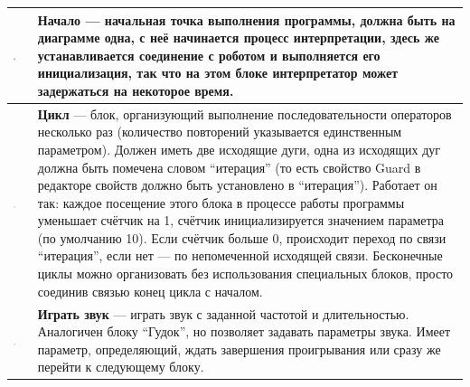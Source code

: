 \documentclass[a4paper,12pt,twoside]{article}
\begin{document}
\begin{center}
	\begin{tabular}{m{} | m{}}
    {\vspace{10pt}\includegraphics[width=0.15\textwidth]{Begin.png}}         & \textbf{Начало} --- начальная точка выполнения программы, должна быть на диаграмме одна, с неё начинается процесс интерпретации, здесь же устанавливается соединение с роботом и выполняется его инициализация, так что на этом блоке интерпретатор может задержаться на некоторое время. \\ \hline
    {\vspace{10pt}\includegraphics[width=0.15\textwidth]{Loop.png}}          & \textbf{Цикл} --- блок, организующий выполнение последовательности операторов несколько раз (количество повторений указывается единственным параметром). Должен иметь две исходящие дуги, одна из исходящих дуг должна быть помечена словом "`итерация"' (то есть свойство Guard в редакторе свойств должно быть установлено в "`итерация"'). Работает он так: каждое посещение этого блока в процессе работы программы уменьшает счётчик на 1, счётчик инициализируется значением параметра (по умолчанию 10). Если счётчик больше 0, происходит переход по связи "`итерация"', если нет --- по непомеченной исходящей связи. Бесконечные циклы можно организовать без использования специальных блоков, просто соединив связью конец цикла с началом. \\ \hline
    {\vspace{10pt}\includegraphics[width=0.15\textwidth]{PlayTone.png}}      & \textbf{Играть звук} --- играть звук с заданной частотой и длительностью. Аналогичен блоку "`Гудок"', но позволяет задавать параметры звука. Имеет параметр, определяющий, ждать завершения проигрывания или сразу же перейти к следующему блоку. \\ \hline

\end{tabular}
\end{center}
\end{document}
